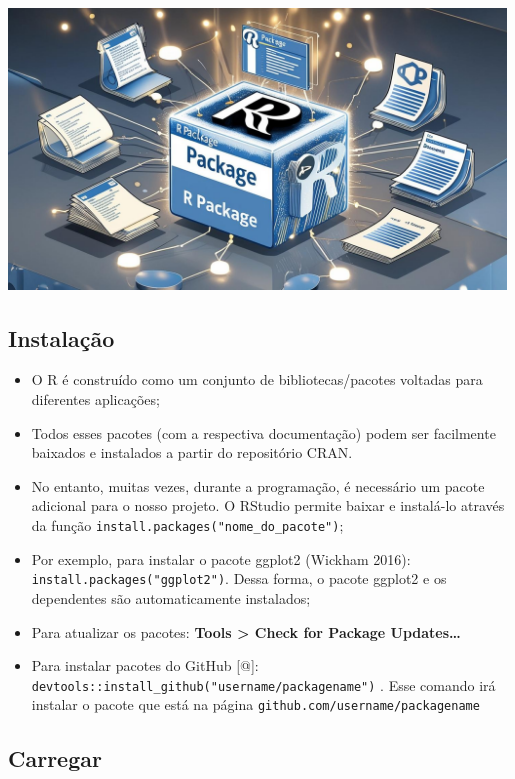 \documentclass[
  letterpaper,
  DIV=11,
  numbers=noendperiod]{scrartcl}
\begin{document}
\begin{center}
\includegraphics[width=5.19792in,height=\textheight]{Figuras/rpackage.jpg}
\end{center}

\subsection{Instalação}\label{instalauxe7uxe3o}

\begin{itemize}
\item
  O R é construído como um conjunto de bibliotecas/pacotes voltadas para
  diferentes aplicações;
\item
  Todos esses pacotes (com a respectiva documentação) podem ser
  facilmente baixados e instalados a partir do repositório CRAN.
\item
  No entanto, muitas vezes, durante a programação, é necessário um
  pacote adicional para o nosso projeto. O RStudio permite baixar e
  instalá-lo através da função
  \texttt{install.packages("nome\_do\_pacote")};
\item
  Por exemplo, para instalar o pacote ggplot2 (Wickham 2016):
  \texttt{install.packages("ggplot2")}. Dessa forma, o pacote ggplot2 e
  os dependentes são automaticamente instalados;
\item
  Para atualizar os pacotes: \textbf{Tools \textgreater{} Check for
  Package Updates\ldots{}}
\item
  Para instalar pacotes do GitHub {[}@{]}:
  \texttt{devtools::install\_github("username/packagename")} . Esse
  comando irá instalar o pacote que está na página
  \texttt{github.com/username/packagename}
\end{itemize}

\subsection{Carregar}\label{carregar}
\end{document}
